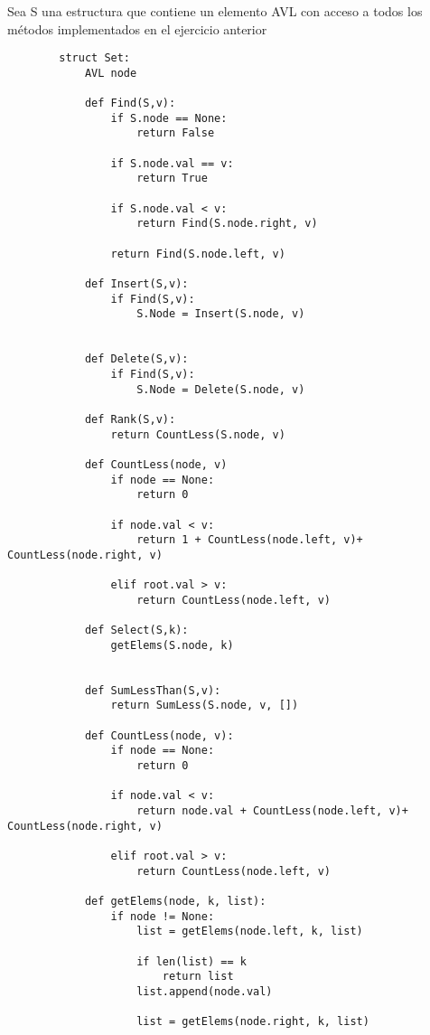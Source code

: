 \documentclass[10pt,a4paper]{article}
\begin{document}
    Sea S una estructura que contiene un elemento AVL con acceso a todos los métodos implementados en el ejercicio 
    anterior

    \begin{lstlisting}
        struct Set:
            AVL node 

            def Find(S,v):
                if S.node == None:
                    return False
                
                if S.node.val == v:
                    return True
                
                if S.node.val < v:
                    return Find(S.node.right, v)
                
                return Find(S.node.left, v)

            def Insert(S,v):
                if Find(S,v):
                    S.Node = Insert(S.node, v)
            

            def Delete(S,v):
                if Find(S,v):
                    S.Node = Delete(S.node, v)
            
            def Rank(S,v):
                return CountLess(S.node, v)
            
            def CountLess(node, v) 
                if node == None:
                    return 0
                
                if node.val < v:
                    return 1 + CountLess(node.left, v)+ CountLess(node.right, v)

                elif root.val > v:
                    return CountLess(node.left, v)
            
            def Select(S,k):
                getElems(S.node, k)


            def SumLessThan(S,v):
                return SumLess(S.node, v, [])

            def CountLess(node, v):
                if node == None:
                    return 0
                
                if node.val < v:
                    return node.val + CountLess(node.left, v)+ CountLess(node.right, v)

                elif root.val > v:
                    return CountLess(node.left, v)

            def getElems(node, k, list):
                if node != None:
                    list = getElems(node.left, k, list)

                    if len(list) == k
                        return list
                    list.append(node.val)

                    list = getElems(node.right, k, list)

            


    \end{lstlisting}
\end{document}

